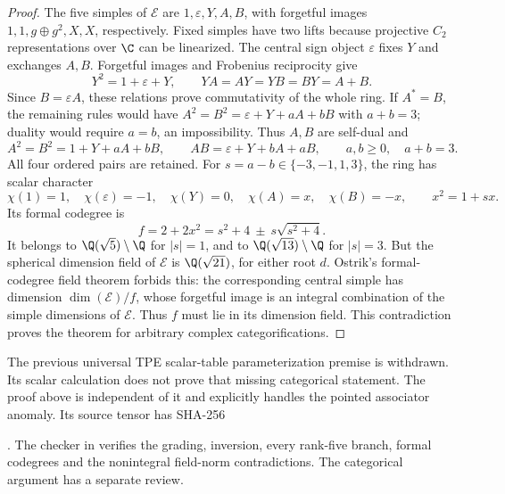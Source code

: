 \begin{proof}
The five simples of $\mathcal E$ are $1,\varepsilon,Y,A,B$, with
forgetful images $1,1,g\oplus g^2,X,X$, respectively. Fixed simples
have two lifts because projective $C_2$ representations over $\C$ can
be linearized. The central sign object $\varepsilon$ fixes $Y$ and
exchanges $A,B$. Forgetful images and Frobenius reciprocity give
\[
Y^2=1+\varepsilon+Y,\qquad YA=AY=YB=BY=A+B.
\]
Since $B=\varepsilon A$, these relations prove commutativity of the
whole ring. If $A^*=B$, the remaining rules would have
$A^2=B^2=\varepsilon+Y+aA+bB$ with $a+b=3$; duality would require
$a=b$, an impossibility. Thus $A,B$ are self-dual and
\[
A^2=B^2=1+Y+aA+bB,\qquad
AB=\varepsilon+Y+bA+aB,\qquad a,b\geq0,\quad a+b=3.
\]
All four ordered pairs are retained. For $s=a-b\in\{-3,-1,1,3\}$,
the ring has scalar character
\[
\chi(1)=1,\quad\chi(\varepsilon)=-1,\quad\chi(Y)=0,
\quad\chi(A)=x,\quad\chi(B)=-x,\qquad x^2=1+sx.
\]
Its formal codegree is
\[
f=2+2x^2=s^2+4\ \pm\ s\sqrt{s^2+4}.
\]
It belongs to $\Q(\sqrt5)\setminus\Q$ for $|s|=1$, and to
$\Q(\sqrt{13})\setminus\Q$ for $|s|=3$. But the spherical dimension
field of $\mathcal E$ is $\Q(\sqrt{21})$, for either root $d$.
Ostrik's formal-codegree field theorem
\cite[Theorem~2.13 and Corollary~2.15]{OstrikPiv3} forbids this: the
corresponding central simple has dimension $\dim(\mathcal E)/f$, whose
forgetful image is an integral combination of the simple dimensions of
$\mathcal E$. Thus $f$ must lie in its dimension field. This contradiction
proves the theorem for arbitrary complex categorifications.
\end{proof}
\begin{remark}
The previous universal TPE scalar-table parameterization premise is
withdrawn. Its scalar calculation does not prove that missing categorical
statement. The proof above is independent of it and explicitly handles
the pointed associator anomaly. Its source tensor has SHA-256
\par\noindent{}.
The checker in  verifies the grading,
inversion, every rank-five branch, formal codegrees and the nonintegral
field-norm contradictions. The categorical argument has a separate review.
\end{remark}
